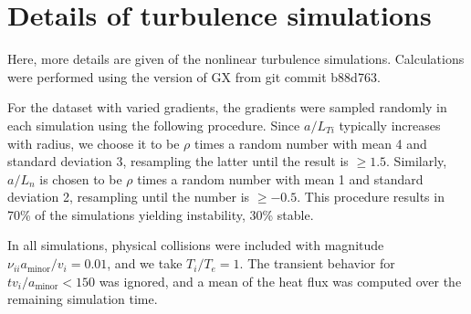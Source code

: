 \documentclass{jpp}
\newcommand{\changed}[1]{{#1}}
\begin{document}

\section{Details of turbulence simulations}
\label{app:turbulence_details}

Here, more details are given of the nonlinear turbulence simulations.
Calculations were performed using the version of GX from git commit b88d763.

For the dataset with varied gradients, the gradients were sampled randomly in each simulation using the following procedure.
Since $a/L_{Ti}$ typically increases with radius, we choose it to be $\rho$ times a random number with mean 4 and standard deviation 3, resampling the latter until the result is $\ge 1.5$.
Similarly, $a/L_n$ is chosen to be $\rho$ times a random number with mean 1 and standard deviation 2, resampling until the number is $\ge -0.5$.
This procedure results in 70\% of the simulations yielding instability, 30\% stable.

In all simulations, physical collisions were included with magnitude $\nu_{ii} a_\mathrm{minor} / v_{i}=0.01$, and we take $T_i / T_e = 1$.
\changed{
The transient behavior for $t v_{i} / a_\mathrm{minor}<150$ was ignored, and a mean of the heat flux was computed over the remaining simulation time.
}
\end{document}
